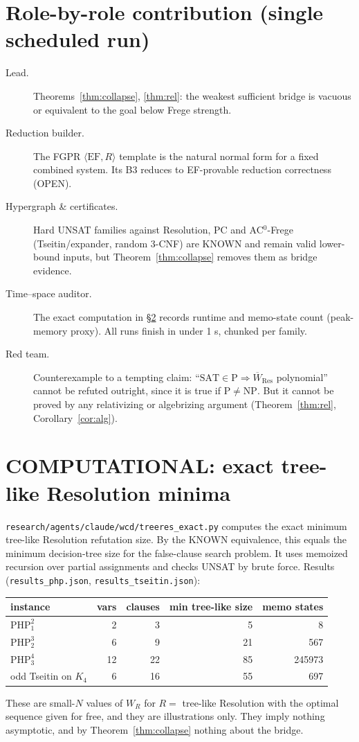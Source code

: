 \documentclass[11pt]{article}
\theoremstyle{definition}
\newcommand{\Wbar}{\overline W}
\begin{document}
\section{Role-by-role contribution (single scheduled run)}
\begin{description}
\item[Lead.] Theorems~\ref{thm:collapse}, \ref{thm:rel}: the weakest sufficient bridge is vacuous or equivalent to the goal below Frege strength.
\item[Reduction builder.] The FGPR $\langle\mathrm{EF},R\rangle$ template is the natural normal form for a fixed combined system. Its B3 reduces to EF-provable reduction correctness (OPEN).
\item[Hypergraph \& certificates.] Hard UNSAT families against Resolution, PC and AC$^0$-Frege (Tseitin/expander, random 3-CNF) are KNOWN and remain valid lower-bound inputs, but Theorem~\ref{thm:collapse} removes them as bridge evidence.
\item[Time--space auditor.] The exact computation in \S\ref{sec:comp} records runtime and memo-state count (peak-memory proxy). All runs finish in under 1 s, chunked per family.
\item[Red team.] Counterexample to a tempting claim: ``$\mathrm{SAT}\in\mathrm{P}\Rightarrow\Wbar_{\mathrm{Res}}$ polynomial'' cannot be refuted outright, since it is true if $\mathrm{P}\ne\mathrm{NP}$. But it cannot be proved by any relativizing or algebrizing argument (Theorem~\ref{thm:rel}, Corollary~\ref{cor:alg}).
\end{description}

\section{COMPUTATIONAL: exact tree-like Resolution minima}\label{sec:comp}
\texttt{research/agents/claude/wcd/treeres\_exact.py} computes the exact minimum tree-like Resolution refutation size. By the KNOWN equivalence, this equals the minimum decision-tree size for the false-clause search problem. It uses memoized recursion over partial assignments and checks UNSAT by brute force. Results (\texttt{results\_php.json}, \texttt{results\_tseitin.json}):
\begin{center}
\begin{tabular}{lrrrr}
instance & vars & clauses & min tree-like size & memo states\\\hline
$\mathrm{PHP}^2_1$ & 2 & 3 & 5 & 8\\
$\mathrm{PHP}^3_2$ & 6 & 9 & 21 & 567\\
$\mathrm{PHP}^4_3$ & 12 & 22 & 85 & 245973\\
odd Tseitin on $K_4$ & 6 & 16 & 55 & 697
\end{tabular}
\end{center}
These are small-$N$ values of $W_R$ for $R=$ tree-like Resolution with the optimal sequence given for free, and they are illustrations only. They imply nothing asymptotic, and by Theorem~\ref{thm:collapse} nothing about the bridge.
\end{document}
